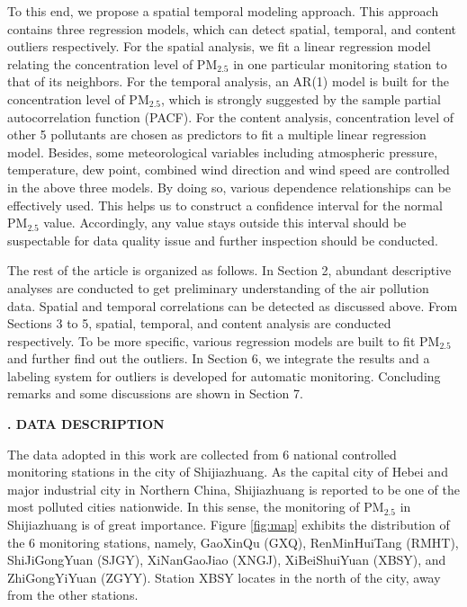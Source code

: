 \documentclass[12pt]{article}
\newcommand{\csection}[1]
    {\begin{center}
        \stepcounter{section}
        {\bf\large\arabic{section}. #1}
    \end{center}
    \vspace{-0.15 cm}
}
\numberwithin{equation}{section}
\begin{document}
To this end, we propose a spatial temporal modeling approach. This approach contains three regression models, which can detect spatial, temporal, and content outliers respectively. For the spatial analysis, we fit a linear regression model relating the concentration level of PM$_{2.5}$ in one particular monitoring station to that of its neighbors. For the temporal analysis, an AR(1) model is built for the concentration level of PM$_{2.5}$, which is strongly suggested by the sample partial autocorrelation function (PACF). For the content analysis, concentration level of other 5 pollutants are chosen as predictors to fit a multiple linear regression model. Besides, some meteorological variables including atmospheric pressure, temperature, dew point, combined wind direction and wind speed are controlled in the above three models. By doing so, various dependence relationships can be effectively used. This helps us to construct a confidence interval for the normal PM$_{2.5}$ value. Accordingly, any value stays outside this interval should be suspectable for data quality issue and further inspection should be conducted.

The rest of the article is organized as follows. In Section 2, abundant descriptive analyses are conducted to get preliminary understanding of the air pollution data. Spatial and temporal correlations can be detected as discussed above. From Sections 3 to 5, spatial, temporal, and content analysis are conducted respectively. To be more specific, various regression models are built to fit PM$_{2.5}$ and further find out the outliers. In Section 6, we integrate the results and a labeling system for outliers is developed for automatic monitoring. Concluding remarks and some discussions are shown in Section 7.


\csection{DATA DESCRIPTION}

The data adopted in this work are collected from 6 national controlled monitoring stations in the city of Shijiazhuang. As the capital city of Hebei and major industrial city in Northern China, Shijiazhuang is reported to be one of the most polluted cities nationwide\citep{web12}. In this sense, the monitoring of PM$_{2.5}$ in Shijiazhuang is of great importance. Figure \ref{fig:map} exhibits the distribution of the 6 monitoring stations, namely, GaoXinQu (GXQ), RenMinHuiTang (RMHT), ShiJiGongYuan (SJGY), XiNanGaoJiao (XNGJ), XiBeiShuiYuan (XBSY), and ZhiGongYiYuan (ZGYY). Station XBSY locates in the north of the city, away from the other stations.
\end{document}
